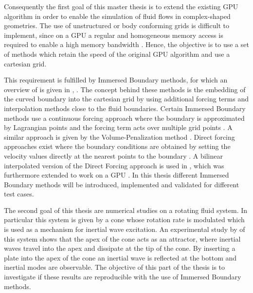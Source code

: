 \bigbreak

Consequently the first goal of this master thesis is to extend the existing GPU algorithm
in order to enable the simulation of fluid flows in complex-shaped geometries.
The use of unstructured or body conforming grids is difficult to implement,
since on a GPU a regular and homogeneous memory access is required to enable a high memory bandwidth \citep{CUDABP}.
Hence, the objective is to use a set of methods which retain the speed of the original GPU algorithm and use a cartesian grid.

This requirement is fulfilled by Immersed Boundary methods, for which an
 overview of is given in \citep{Mittal2005}, \citep{Gornak2013}.
The concept behind these methods is the embedding of the curved boundary into the cartesian grid
by using additional forcing terms and interpolation methods close to the fluid boundaries.
Certain Immersed Boundary methods use a continuous forcing approach where the boundary is approximated by Lagrangian points
and the forcing term acts over multiple grid points \citep{Mittal2005}.
A similar approach is given by the Volume-Penalization method \citep{Lulff2011}.
Direct forcing approaches exist where the boundary conditions are obtained by setting the
velocity values directly at the nearest points to the boundary \citep{Fadlun2000}.
A bilinear interpolated version of the Direct Forcing approach is used in \citep{Gornak2013},
which was furthermore extended to work on a GPU \citep{DeLeon2012}.
In this thesis different Immersed Boundary methods will be introduced, implemented and
validated for different test cases.

\bigbreak

The second goal of this thesis are numerical studies on a rotating fluid system.
In particular this system is given by a cone whose rotation rate is modulated which is used as a mechanism for inertial wave excitation.
An experimental study by  \citeauthor{Beardsley1970} \citep{Beardsley1970} of this system shows that the apex of the cone acts as an attractor,
where inertial waves travel into the apex and dissipate at the tip of the cone.
By inserting a plate into the apex of the cone an inertial wave is reflected at the bottom and inertial modes are observable.
The objective of this part of the thesis is to investigate if these results
are reproducible with the use of Immersed Boundary methods.

\bigbreak

